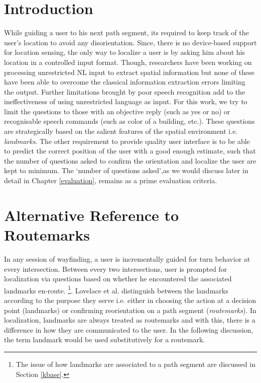 \documentclass{iitkthesis}
\begin{document}
\section{Introduction} 
While guiding a user to his next path segment, its required to keep track of the user's location to avoid any disorientation. Since, there is no device-based support for location sensing, the only way to localize a user is by asking him about his location in a controlled input format. Though, researchers \cite{tellex:language, Kordjamshidi:labelling, matuszek:following} have been working on processing unrestricted NL input to extract spatial information but none of these have been able to overcome the classical information extraction errors limiting the output. Further limitations brought by poor speech recognition add to the ineffectiveness of using unrestricted language as input. 
For this work, we try to limit the questions to those with an objective reply (such as yes or no) or recognisable speech commands (such as color of a building, etc.). These questions are strategically based on the salient features of the spatial environment i.e. \textit{landmarks}. The other requirement to provide quality user interface is to be able to predict the correct position of the user with a good enough estimate, such that the number of questions asked to confirm the orientation and localize the user are kept to minimum. The `number of questions asked',as we would discuss later in detail in Chapter \ref{evaluation}, remains as a prime evaluation criteria.

\section{Alternative Reference to Routemarks}
\label{sec:altref}
In any session of wayfinding, a user is incrementally guided for turn behavior at every intersection. Between every two intersections, user is prompted for localization via questions based on whether he encountered the associated landmarks en-route. \footnote{The issue of how landmarks are associated to a path segment are discussed in Section \ref{kbase}.}. Lovelace et al. \cite{lovelace} distinguish between the landmarks according to the purpose they serve i.e. either in choosing the action at a decision point (landmarks) or confirming reorientation on a path segment (\textit{routemarks}). In localization, landmarks are always treated as routemarks and with this, there is a difference in how they are communicated to the user. In the following discussion, the term landmark would be used substitutively for a routemark. 
\end{document}
